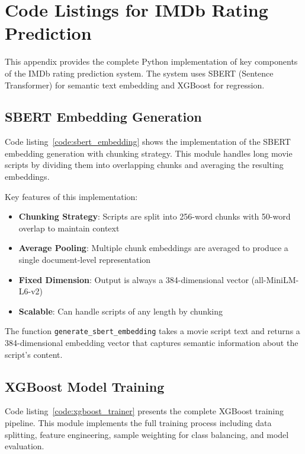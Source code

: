 \chapter{Code Listings for IMDb Rating Prediction}

This appendix provides the complete Python implementation of key components of the IMDb rating prediction system. The system uses SBERT (Sentence Transformer) for semantic text embedding and XGBoost for regression.

\section{SBERT Embedding Generation}

Code listing~\ref{code:sbert_embedding} shows the implementation of the SBERT embedding generation with chunking strategy. This module handles long movie scripts by dividing them into overlapping chunks and averaging the resulting embeddings.



Key features of this implementation:

\begin{itemize}
    \item \textbf{Chunking Strategy}: Scripts are split into 256-word chunks with 50-word overlap to maintain context
    \item \textbf{Average Pooling}: Multiple chunk embeddings are averaged to produce a single document-level representation
    \item \textbf{Fixed Dimension}: Output is always a 384-dimensional vector (all-MiniLM-L6-v2)
    \item \textbf{Scalable}: Can handle scripts of any length by chunking
\end{itemize}

The function \texttt{generate\_sbert\_embedding} takes a movie script text and returns a 384-dimensional embedding vector that captures semantic information about the script's content.

\section{XGBoost Model Training}

Code listing~\ref{code:xgboost_trainer} presents the complete XGBoost training pipeline. This module implements the full training process including data splitting, feature engineering, sample weighting for class balancing, and model evaluation.

